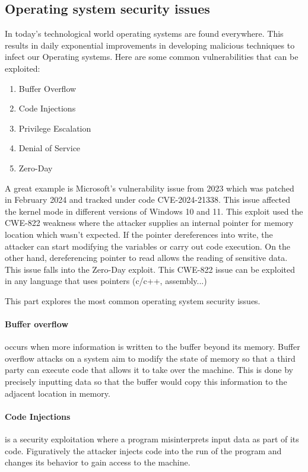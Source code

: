 \documentclass[10pt,oneside,english,a4paper]{article}
\begin{document}
\subsection{Operating system security issues}
In today’s technological world operating systems are found everywhere. This results in daily exponential improvements in developing malicious techniques to infect our Operating systems.
Here are some common vulnerabilities that can be exploited:

\begin{enumerate}
	\item Buffer Overflow
	\item Code Injections
	\item Privilege Escalation
	\item Denial of Service
	\item Zero-Day
\end{enumerate}
A great example is Microsoft’s vulnerability issue from 2023 which was patched in February 2024 and tracked under code CVE-2024-21338. This issue affected the kernel mode in different versions of Windows 10 and 11. This exploit used the CWE-822 weakness where the attacker supplies an internal pointer for memory location which wasn’t expected. If the pointer dereferences into write, the attacker can start modifying the variables or carry out code execution. On the other hand, dereferencing pointer to read allows the reading of sensitive data. This issue falls into the Zero-Day exploit. This CWE-822 issue can be exploited in any language that uses pointers (c/c++, assembly...)\cite{8.zdroj}\cite{9.zdroj}

\vspace{0.5cm}
This part explores the most common operating system security issues.

\paragraph{Buffer overflow}occurs when more information is written to the buffer beyond its memory. Buffer overflow attacks on a system aim to modify the state of memory so that a third party can execute code that allows it to take over the machine. This is done by precisely inputting data so that the buffer would copy this information to the adjacent location in memory.


\paragraph{Code Injections} is a security exploitation where a program misinterprets input data as part of its code. Figuratively the attacker injects code into the run of the program and changes its behavior to gain access to the machine.
\end{document}
